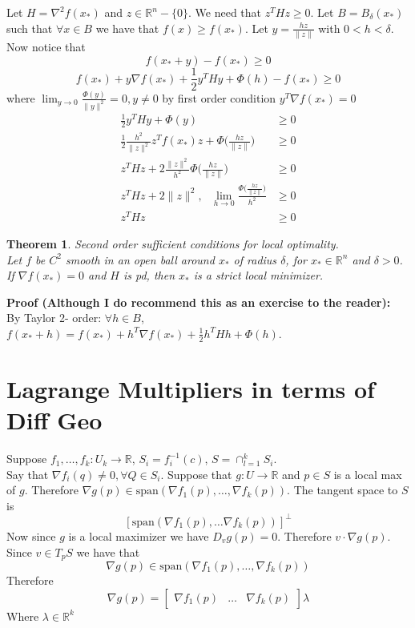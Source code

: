 \documentclass[titlepage]{article}
\theoremstyle{plain}
\newtheorem{thm}{Theorem}[section]
\theoremstyle{definition}
\theoremstyle{remark}
\begin{document}
Let $H = \nabla^2 f(x_*)$ and $z \in \mathbb{R}^n - \{0\}$.
We need that $z^T H z \geq 0$. Let $B = B_\delta(x_*)$ such that $\forall x \in
B$ we have that $f(x) \geq f(x_*)$. Let $y = \frac{hz}{\|z\|}$ with $0 < h <
\delta$.
Now notice that
\[f(x_* + y) - f(x_*) \geq 0\]
\[f(x_*) + y \nabla f(x_*) + \frac{1}{2} y^T H y + \Phi(h) - f(x_*) \geq 0\]
where $\lim_{y \to 0} \frac{\Phi(y)}{\|y\|^2} = 0, y\not = 0$ by first order
condition $y^T \nabla f(x_*) = 0$
\begin{align*}
\frac{1}{2} y^T H y + \Phi(y) &\geq 0\\
\frac{1}{2} \frac{h^2}{\|z\|^2} z^T f(x_*) z + \Phi\Big(\frac{hz}{\|z\|}\Big) &\geq 0\\
z^T H z + 2 \frac{\|z\|^2}{h^2} \Phi\Big(\frac{hz}{\|z\|}\Big) &\geq 0\\
z^T H z + 2 \|z\|^2,\text{ } \lim_{h \to 0} \frac{\Phi\Big(\frac{hz}{\|z\|}\Big)}{h^2} &
\geq 0\\
z^T H z &\geq 0
\end{align*}
\begin{thm} Second order sufficient conditions for local optimality.\\
Let $f$ be $C^2$ smooth in an open ball around $x_*$ of radius $\delta$, for
$x_* \in \mathbb{R}^n$ and $\delta > 0$. If $\nabla f(x_*) = 0$ and $H$ is pd,
then $x_*$ is a strict local minimizer.
\end{thm}
\noindent \textbf{Proof (Although I do recommend this as an exercise to the
reader): }\\

By Taylor 2- order: $\forall h \in B$, $f(x_* + h) = f(x_*) + h^T \nabla f(x_*)
+ \frac{1}{2} h^T H h + \Phi(h)$.
\section*{Lagrange Multipliers in terms of Diff Geo}
Suppose $f_1, \hdots, f_k : U_k \to \mathbb{R}$, $S_i = f_i^{-1}(c)$, $S =
\cap_{l = 1}^k S_i$.\\

 Say that $\nabla f_i(q) \not = 0, \forall Q \in S_i$.
Suppose that $g : U \to \mathbb{R}$ and $p \in S$ is a local max of $g$.
Therefore $\nabla g(p) \in \text{span}(\nabla f_1(p), \hdots, \nabla f_k(p))$.
The tangent space to $S$ is
\[[\text{span}(\nabla f_1(p), \hdots \nabla f_k(p))]^{\bot}\]
Now since $g$ is a local maximizer we have $D_v g(p) = 0$. Therefore
$v \cdot \nabla g(p)$. Since $v \in T_p S$ we have that
\[\nabla g(p) \in \text{span}(\nabla f_1(p), \hdots, \nabla f_k(p))\]
Therefore
\[\nabla g(p) = \begin{bmatrix} \nabla f_1(p) & \hdots & \nabla f_k(p)
\end{bmatrix} \lambda\]
Where $\lambda \in \mathbb{R}^k$
\end{document}
